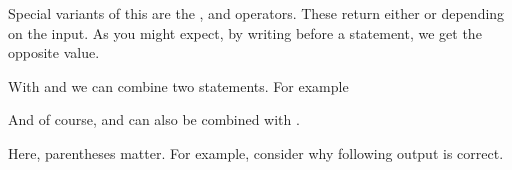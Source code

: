 \documentclass[letterpaper,10pt,english]{jupyterBook}
\begin{document}
\sphinxAtStartPar
Special variants of this are the ,  and  operators. These return either  or  depending on the input. As you might expect, by writing  before a statement, we get the opposite value.

\begin{sphinxVerbatim}[commandchars=\\\{\}]
  
  
   
\end{sphinxVerbatim}

\sphinxAtStartPar
With  and  we can combine two statements. For example

\begin{sphinxVerbatim}[commandchars=\\\{\}]
  
  
      
      
\end{sphinxVerbatim}

\sphinxAtStartPar
And of course,  and  can also be combined with .

\begin{sphinxVerbatim}[commandchars=\\\{\}]
       
\end{sphinxVerbatim}

\sphinxAtStartPar
Here, parentheses \sphinxcode{\sphinxupquote{()}} matter. For example, consider why following output is correct.
\end{document}
